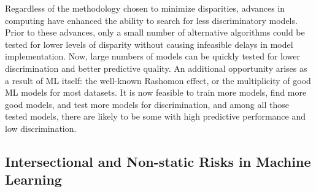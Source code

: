 \documentclass[information,article,accept,moreauthors,pdftex]{Definitions/mdpi}
\begin{document}
{{{Regardless of the methodology chosen to minimize disparities, advances in computing have enhanced the ability to search for less discriminatory models.  Prior to these advances, only a small number of alternative algorithms could be tested for lower levels of disparity without causing infeasible delays in model implementation.  Now, large numbers of models can be quickly tested for lower discrimination and better predictive quality.  An additional opportunity arises as a result of ML itself: the well-known Rashomon effect, or the multiplicity of good ML models for most datasets. It is now feasible to train more models, find more good models, and test more models for discrimination, and among all those tested models, there are likely to be some with high predictive performance and low discrimination.

\subsection{Intersectional and Non-static Risks in Machine Learning}

}}}
\end{document}

